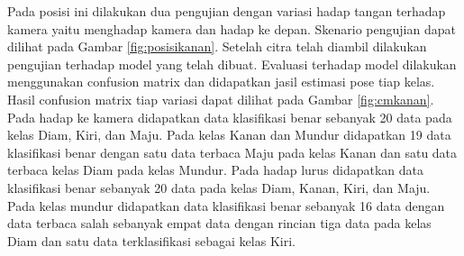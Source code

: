 \begin{enumerate}
  Pada posisi ini dilakukan dua pengujian dengan variasi hadap tangan terhadap kamera yaitu menghadap kamera dan hadap ke depan. Skenario pengujian dapat dilihat pada Gambar \ref{fig:posisikanan}. Setelah citra telah diambil dilakukan pengujian terhadap model yang telah dibuat. Evaluasi terhadap model dilakukan menggunakan confusion matrix dan didapatkan jasil estimasi pose tiap kelas. Hasil confusion matrix tiap variasi dapat dilihat pada Gambar \ref{fig:cmkanan}. Pada hadap ke kamera didapatkan data klasifikasi benar sebanyak 20 data pada kelas Diam, Kiri, dan Maju. Pada kelas Kanan dan Mundur didapatkan 19 data klasifikasi benar dengan satu data terbaca Maju pada kelas Kanan dan satu data terbaca kelas Diam pada kelas Mundur. Pada hadap lurus didapatkan data klasifikasi benar sebanyak 20 data pada kelas Diam, Kanan, Kiri, dan Maju. Pada kelas mundur didapatkan data klasifikasi benar sebanyak 16 data dengan data terbaca salah sebanyak empat data dengan rincian tiga data pada kelas Diam dan satu data terklasifikasi sebagai kelas Kiri.


\end{enumerate}
